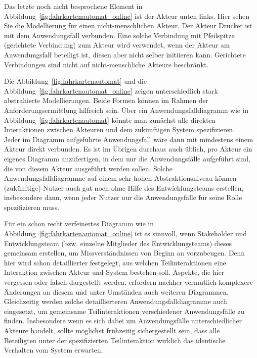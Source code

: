 Das letzte noch nicht besprochene Element in Abbildung~\ref{fig:fahrkartenautomat_online} ist der Akteur  unten links. Hier sehen Sie die Modellierung für einen nicht-menschlichen Akteur. Der Akteur Drucker ist mit dem Anwendungsfall  verbunden. Eine solche Verbindung mit Pfeilspitze (gerichtete Verbindung) zum Akteur wird verwendet, wenn der Akteur am Anwendungsfall beteiligt ist, diesen aber nicht selber initiieren kann. Gerichtete Verbindungen sind nicht auf nicht-menschliche Akteure beschränkt.

\vspace{2mm} %


Die Abbildung~\ref{fig:fahrkartenautomat} und die Abbildung~\ref{fig:fahrkartenautomat_online} zeigen unterschiedlich stark abstrahierte Modellierungen. Beide Formen können im Rahmen der Anforderungsermittlung hilfreich sein. Über ein Anwendungsfalldiagramm wie in Abbildung~\ref{fig:fahrkartenautomat} könnte man zunächst alle direkten Interaktionen zwischen Akteuren und dem zukünftigen System spezifizieren. Jeder im Diagramm aufgeführte Anwendungsfall wäre dann mit mindestens einem Akteur direkt verbunden. Es ist im Übrigen durchaus auch üblich, pro Akteur ein eigenes Diagramm anzufertigen, in dem nur die Anwendungsfälle aufgeführt sind, die von diesem Akteur ausgeführt werden sollen. Solche Anwendungsfall\-diagramme auf einem sehr hohen Abstraktionsniveau können (zukünftige) Nutzer auch gut noch ohne Hilfe des Entwicklungsteams erstellen, insbesondere dann, wenn jeder Nutzer nur die Anwendungsfälle für seine Rolle spezifizieren muss.

Für ein schon recht verfeinertes Diagramm wie in Abbildung~\ref{fig:fahrkartenautomat_online} ist es sinnvoll, wenn Stakeholder und Entwicklungsteam (bzw. einzelne Mitglieder des Entwicklungsteams) dieses gemeinsam erstellen, um Missverständnissen von Beginn an vorzubeugen. Denn hier wird schon detaillierter festgelegt, aus welchen Teil\-inter\-aktionen eine Interaktion zwischen Akteur und System bestehen soll. Aspekte, die hier vergessen oder falsch dargestellt werden, erfordern nachher vermutlich komplexere Änderungen an diesem und unter Umständen auch weiteren Diagrammen. Gleichzeitig werden solche detaillierteren Anwendungsfalldiagramme auch eingesetzt, um gemeinsame Teil\-inter\-aktionen verschiedener Anwendungsfälle zu finden. Insbesondere wenn es sich dabei um Anwendungsfälle unterschiedlicher Akteure handelt, sollte möglichst frühzeitig sichergestellt sein, dass alle Beteiligten unter der spezifizierten Teilinteraktion wirklich das identische Verhalten vom System erwarten. 

